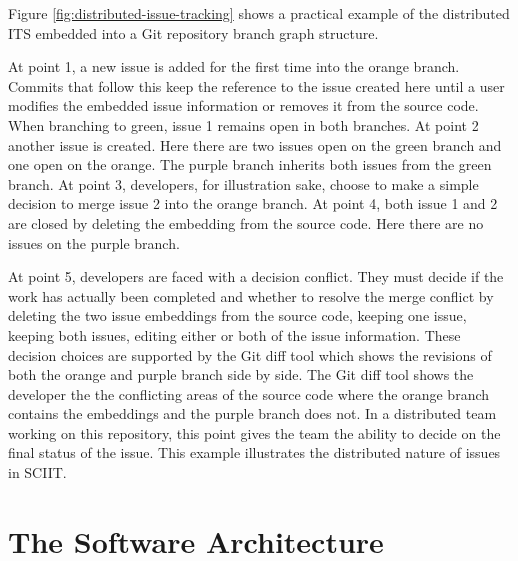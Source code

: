 \documentclass{mproj}
\begin{document}
Figure \ref{fig:distributed-issue-tracking} shows a practical example of the distributed ITS embedded into a Git repository branch graph structure. 

At point 1, a new issue is added for the first time into the orange branch. Commits that follow this keep the reference to the issue created here until a user modifies the embedded issue information or removes it from the source code. When branching to green, issue 1 remains open in both branches. At point 2 another issue is created. Here there are two issues open on the green branch and one open on the orange. The purple branch inherits both issues from the green branch. At point 3, developers, for illustration sake, choose to make a simple decision to merge issue 2 into the orange branch. At point 4, both issue 1 and 2 are closed by deleting the embedding from the source code. Here there are no issues on the purple branch. 

At point 5, developers are faced with a decision conflict. They must decide if the work has actually been completed and whether to resolve the merge conflict by deleting the two issue embeddings from the source code, keeping one issue, keeping both issues, editing either or both of the issue information. These decision choices are supported by the Git diff tool which shows the revisions of both the orange and purple branch side by side. The Git diff tool shows the developer the the conflicting areas of the source code where the orange branch contains the embeddings and the purple branch does not. In a distributed team working on this repository, this point gives the team the ability to decide on the final status of the issue. This example illustrates the distributed nature of issues in SCIIT.


\section{The Software Architecture}
\end{document}
